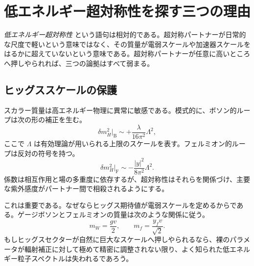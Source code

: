 \section{低エネルギー超対称性を探す三つの理由}

\begin{classroomqa}
\end{classroomqa}

\emph{低エネルギー超対称性} という語句は相対的である。超対称パートナーが日常的な尺度で軽いという意味ではなく、その質量が電弱スケールや加速器スケールをはるかに超えていないという意味である。超対称パートナーが任意に高いところへ押しやられれば、三つの論拠はすべて弱まる。

\subsection{ヒッグススケールの保護}

スカラー質量は高エネルギー物理に異常に敏感である。模式的に、ボソン的ループは次の形の補正を生む。
\begin{equation}
\delta m_H^2\big|_{\mathrm B}
\sim +\frac{\lambda}{16\pi^2}\Lambda^2,
\end{equation}
ここで \(\Lambda\) は有効理論が用いられる上限のスケールを表す。フェルミオン的ループは反対の符号を持つ。
\begin{equation}
\delta m_H^2\big|_{\mathrm F}
\sim -\frac{|y|^2}{8\pi^2}\Lambda^2.
\end{equation}
係数は相互作用と場の多重度に依存するが、超対称性はそれらを関係づけ、主要な紫外感度がパートナー間で相殺されるようにする。

これは重要である。なぜならヒッグス期待値が電弱スケールを定めるからである。ゲージボソンとフェルミオンの質量は次のような関係に従う。
\begin{equation}
m_W=\frac{gv}{2},
\qquad
m_f=\frac{y_fv}{\sqrt2}.
\end{equation}
もしヒッグスセクターが自然に巨大なスケールへ押しやられるなら、裸のパラメータが輻射補正に対して極めて精密に調整されない限り、よく知られた低エネルギー粒子スペクトルは失われるであろう。

